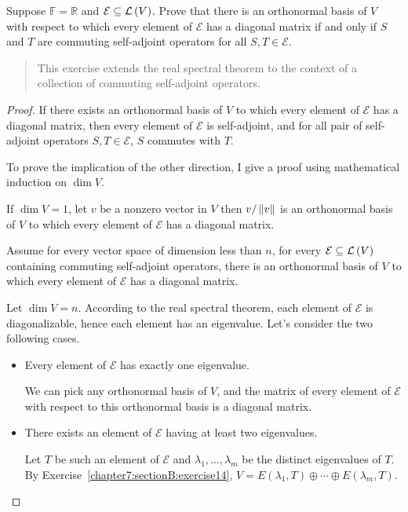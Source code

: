 \begin{exercise}
    Suppose $\mathbb{F} = \mathbb{R}$ and $\mathcal{E} \subseteq \mathcal{L}\left({V}\right)$. Prove that there is an orthonormal basis of $V$ with respect to which every element of $\mathcal{E}$ has a diagonal matrix if and only if $S$ and $T$ are commuting self-adjoint operators for all $S, T \in \mathcal{E}$.
\end{exercise}

\begin{quote}
    This exercise extends the real spectral theorem to the context of a collection
    of commuting self-adjoint operators.
\end{quote}

\begin{proof}
    If there exists an orthonormal basis of $V$ to which every element of $\mathcal{E}$ has a diagonal matrix, then every element of $\mathcal{E}$ is self-adjoint, and for all pair of self-adjoint operators $S, T\in\mathcal{E}$, $S$ commutes with $T$.

    To prove the implication of the other direction, I give a proof using mathematical induction on $\dim V$.

    If $\dim V = 1$, let $v$ be a nonzero vector in $V$ then $v/\left\Vert{v}\right\Vert$ is an orthonormal basis of $V$ to which every element of $\mathcal{E}$ has a diagonal matrix.

    Assume for every vector space of dimension less than $n$, for every $\mathcal{E}\subseteq\mathcal{L}\left({V}\right)$ containing commuting self-adjoint operators, there is an orthonormal basis of $V$ to which every element of $\mathcal{E}$ has a diagonal matrix.

    Let $\dim V = n$. According to the real spectral theorem, each element of $\mathcal{E}$ is diagonalizable, hence each element has an eigenvalue. Let's consider the two following cases.
    \begin{itemize}
        \item Every element of $\mathcal{E}$ has exactly one eigenvalue.

              We can pick any orthonormal basis of $V$, and the matrix of every element of $\mathcal{E}$ with respect to this orthonormal basis is a diagonal matrix.
        \item There exists an element of $\mathcal{E}$ having at least two eigenvalues.

              Let $T$ be such an element of $\mathcal{E}$ and $\lambda_{1}, \ldots, \lambda_{m}$ be the distinct eigenvalues of $T$. By Exercise~\ref{chapter7:sectionB:exercise14}, $V = E(\lambda_{1}, T)\oplus \cdots \oplus E(\lambda_{m}, T)$.


\end{itemize}
\end{proof}

